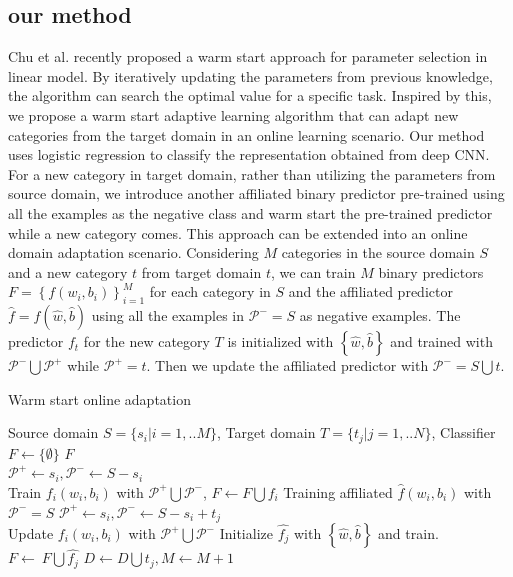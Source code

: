 \subsection{our method}
Chu et al. recently proposed a warm start approach for parameter selection in linear model. By iteratively updating the parameters from previous knowledge, the algorithm can search the optimal value for a specific task\cite{chuwarm}. Inspired by this, we propose a warm start adaptive learning algorithm that can adapt new categories from the target domain in an online learning scenario. Our method uses logistic regression to classify the representation obtained from deep CNN. For a new category in target domain, rather than utilizing the parameters from source domain, we introduce another affiliated binary predictor pre-trained using all the examples as the negative class and warm start the pre-trained predictor while a new category comes. This approach can be extended into an online domain adaptation scenario. Considering $M$ categories in the source domain $S$ and a new category $t$ from target domain $t$, we can train $M$ binary predictors $F=\left\{ {{f}\left( {{w_i},{b_i}} \right)} \right\}_{i = 1}^M$ for each category in $S$ and the affiliated predictor $\hat{f}=f(\hat{w},\hat{b})$ using all the examples in $\mathcal{P^-}=S$ as negative examples. The predictor $f_t$ for the new category $T$ is initialized with $\left\{\hat{w},\hat{b}\right\}$ and trained with $\mathcal{P^-}\bigcup\mathcal{P^+}$ while $\mathcal{P^+}=t$. Then we update the affiliated predictor with $\mathcal{P^-}=S\bigcup t$.
\begin{algorithm}
  \caption{Warm start online adaptation}\label{algo:ws}
  \begin{algorithmic}[1]
    \REQUIRE Source domain $S = \{ {s_i}|i = 1,..M\} $, Target domain $T = \{ {t_j}|j = 1,..N\} $, Classifier $F\leftarrow \{\emptyset\}$
    \ENSURE $F$\\
         \STATE $\mathcal{P^+}\leftarrow s_i, \mathcal{P^-}\leftarrow S-s_i$\\
          Train ${{f_i}\left( {{w_i},{b_i}} \right)}$ with $\mathcal{P^+}\bigcup\mathcal{P^-}$, $F\leftarrow F\bigcup f_i$        
    \ENDFOR
    \STATE Training affiliated $\hat{f}\left( {{w_i},{b_i}} \right)$ with $\mathcal{P^-}=S$
             \STATE $\mathcal{P^+}\leftarrow s_i, \mathcal{P^-}\leftarrow S-s_i+t_j$ \\
              Update ${{f_i}\left( {{w_i},{b_i}} \right)}$ with $\mathcal{P^+}\bigcup\mathcal{P^-}$
        \ENDFOR
        \STATE Initialize $\hat{f_j}$ with $\left\{\hat{w},\hat{b}\right\}$ and train.
        \STATE $F\leftarrow\ F\bigcup \hat{f_j}$ 
        \STATE $D\leftarrow D\bigcup t_j, M\leftarrow M+1$ 
     \ENDWHILE
  \end{algorithmic}
\end{algorithm} 

